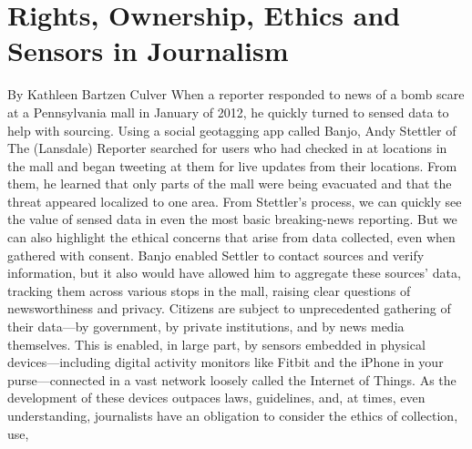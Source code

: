 \section{Rights, Ownership, Ethics and Sensors in Journalism}
By Kathleen Bartzen Culver
When a reporter responded to news of a bomb scare at a Pennsylvania mall
in January of 2012, he quickly turned to sensed data to help with sourcing.
Using a social geotagging app called Banjo, Andy Stettler of The (Lansdale)
Reporter searched for users who had checked in at locations in the mall and
began tweeting at them for live updates from their locations. From them, he
learned that only parts of the mall were being evacuated and that the threat
appeared localized to one area.
From Stettler's process, we can quickly see the value of sensed data in even
the most basic breaking-news reporting. But we can also highlight the ethical
concerns that arise from data collected, even when gathered with consent.
Banjo enabled Settler to contact sources and verify information, but it
also would have allowed him to aggregate these sources' data, tracking them
across various stops in the mall, raising clear questions of newsworthiness
and privacy.
Citizens are subject to unprecedented gathering of their data—by government,
by private institutions, and by news media themselves. This is enabled,
in large part, by sensors embedded in physical devices—including digital
activity monitors like Fitbit and the iPhone in your purse—connected in
a vast network loosely called the Internet of Things. As the development
of these devices outpaces laws, guidelines, and, at times, even understanding,
journalists have an obligation to consider the ethics of collection, use,

